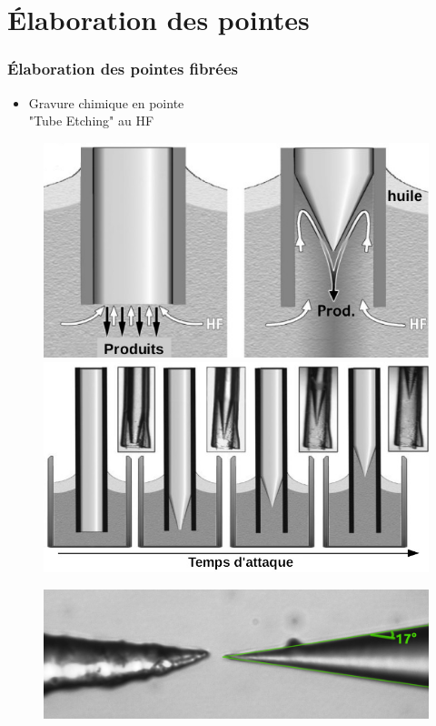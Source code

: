 \documentclass[9pt,a9paper,handout]{beamer}
\begin{document}
\section{Élaboration des pointes}
    \begin{frame}
        \frametitle{Élaboration des pointes fibrées}
        \begin{itemize}
            \item Gravure chimique en pointe\\
            \qquad "Tube Etching" au HF
        \end{itemize}

        \begin{figure}[h]\centering
            \includegraphics[width=.4\textwidth]{Images/Schemas/gravure}
            \hspace*{3mm}
            \includegraphics[width=.4\textwidth]{Images/Schemas/gravure_2}
        \end{figure}
        \vspace*{1cm}

        \begin{figure}[h]\centering
            \includegraphics[width=.55\textwidth]{Images/PhotosPointes/Nues_ok_et_abimee}
        \end{figure}
        \let\thefootnote\relax{}
    \end{frame}
\end{document}
